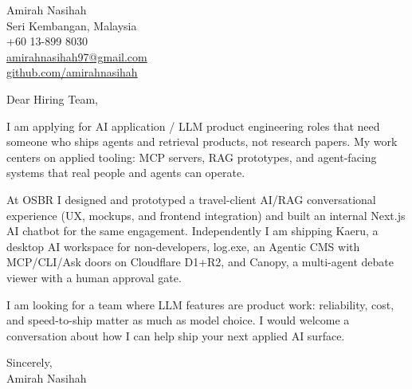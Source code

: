 \documentclass[11pt]{article}
\begin{document}
\begin{flushleft}
Amirah Nasihah\\
Seri Kembangan, Malaysia\\
+60 13-899 8030\\
\href{mailto:amirahnasihah97@gmail.com}{amirahnasihah97@gmail.com}\\
\href{https://github.com/amirahnasihah}{github.com/amirahnasihah}
\end{flushleft}

\vspace{12pt}
\noindent Dear Hiring Team,

I am applying for AI application / LLM product engineering roles that need
someone who ships agents and retrieval products, not research papers. My work
centers on applied tooling: MCP servers, RAG prototypes, and agent-facing
systems that real people and agents can operate.

At OSBR I designed and prototyped a travel-client AI/RAG conversational
experience (UX, mockups, and frontend integration) and built an internal
Next.js AI chatbot for the same engagement. Independently I am shipping Kaeru,
a desktop AI workspace for non-developers, log.exe, an Agentic CMS with
MCP/CLI/Ask doors on Cloudflare D1+R2, and Canopy, a multi-agent debate viewer
with a human approval gate.

I am looking for a team where LLM features are product work: reliability, cost,
and speed-to-ship matter as much as model choice. I would welcome a conversation
about how I can help ship your next applied AI surface.

\vspace{12pt}
\noindent Sincerely,\\
Amirah Nasihah
\end{document}
